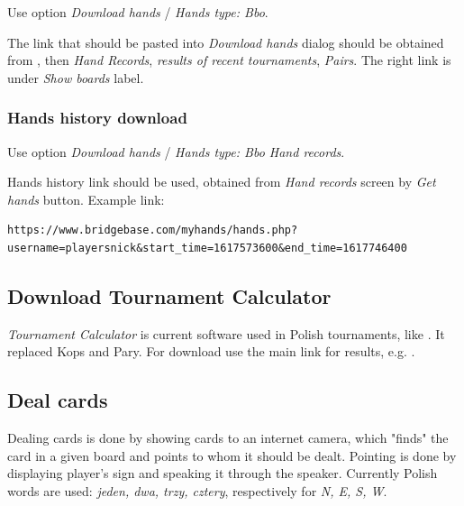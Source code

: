 \documentclass[polish,a4paper,11pt,oneside]{article}
\begin{document}
Use option {\em Download hands} / {\em Hands type: Bbo}.

The link that should be pasted into {\em Download hands} dialog
should be obtained from \bbolonglink, then {\em Hand Records},
{\em results of recent tournaments}, {\em Pairs}.
The right link is under {\em Show boards} label.

\subsubsection{Hands history download}

Use option {\em Download hands} / {\em Hands type: Bbo Hand records}.

Hands history link should be used, obtained from {\em Hand records} screen by {\em Get hands} button.
Example link:
\begin{verbatim}
https://www.bridgebase.com/myhands/hands.php?username=playersnick&start_time=1617573600&end_time=1617746400
\end{verbatim}


\subsection{Download Tournament Calculator} \label{pobTourCalc}

  {\em Tournament Calculator} is current software used in Polish tournaments,
  like .
  It replaced Kops and Pary.
  For download use the main link for results,
  e.g. .


\subsection{Deal cards} \label{rozdaj}

Dealing cards is done by showing cards to an internet camera,
which "finds" the card in a given board and points to whom it should be dealt.
Pointing is done by displaying player's sign and speaking it through the speaker.
Currently Polish words are used: {\em jeden, dwa, trzy, cztery},
respectively for {\em N, E, S, W}. %
\end{document}
